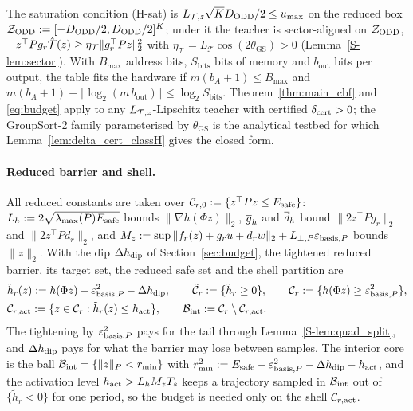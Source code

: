 The saturation condition (H-sat) is $L_{\mathcal{T},z}\sqrt{K}D_{\mathrm{ODD}}/2 \le u_{\max}$ on the reduced box $\mathcal{Z}_{\mathrm{ODD}} := [-D_{\mathrm{ODD}}/2, D_{\mathrm{ODD}}/2]^K$; under it the teacher is sector-aligned on $\mathcal{Z}_{\mathrm{ODD}}$, $-z^\top Pg_r\hat{\mathcal{T}}(z) \ge \eta_{\mathcal{T}}\|g_r^\top Pz\|_2^2$ with $\eta_{\mathcal{T}} = L_{\mathcal{T}}\cos(2\theta_{\mathrm{GS}}) > 0$ (Lemma~\ref{S-lem:sector}). With $B_{\max}$ address bits, $S_{\mathrm{bits}}$ bits of memory and $b_{\mathrm{out}}$ bits per output, the table fits the hardware if $m(b_A + 1) \le B_{\max}$ and $m(b_A+1) + \lceil\log_2(m\,b_{\mathrm{out}})\rceil \le \log_2 S_{\mathrm{bits}}$. Theorem~\ref{thm:main_cbf} and \eqref{eq:budget} apply to any $L_{\mathcal{T},z}$-Lipschitz teacher with certified $\delta_{\mathrm{cert}} > 0$; the GroupSort-2 family parameterised by $\theta_{\mathrm{GS}}$ is the analytical testbed for which Lemma~\ref{lem:delta_cert_classH} gives the closed form.

\paragraph{Reduced barrier and shell.}
All reduced constants are taken over $\mathcal{C}_{r,0} := \{z^\top Pz \le E_{\mathrm{safe}}\}$: $L_h := 2\sqrt{\lambda_{\max}(P)E_{\mathrm{safe}}}$ bounds $\|\nabla h(\Phi z)\|_2$, $\overline{g}_h$ and $\overline{d}_h$ bound $\|2z^\top Pg_r\|_2$ and $\|2z^\top Pd_r\|_2$, and $M_z := \sup\|f_r(z) + g_ru + d_rw\|_2 + L_{\perp,P}\varepsilon_{\mathrm{basis},P}$ bounds $\|\dot z\|_2$. With the dip $\Delta h_{\mathrm{dip}}$ of Section~\ref{sec:budget}, the tightened reduced barrier, its target set, the reduced safe set and the shell partition are
\begin{equation}
\label{eq:htilde}
\begin{aligned}
&\tilde h_r(z) := h(\Phi z) - \varepsilon_{\mathrm{basis},P}^2 - \Delta h_{\mathrm{dip}}, \qquad \tilde{\mathcal{C}}_r := \{\tilde h_r \ge 0\}, \qquad \mathcal{C}_r := \{h(\Phi z) \ge \varepsilon_{\mathrm{basis},P}^2\},\\
&\mathcal{C}_{r,\mathrm{act}} := \{z \in \mathcal{C}_r : \tilde h_r(z) \le h_{\mathrm{act}}\}, \qquad \mathcal{B}_{\mathrm{int}} := \mathcal{C}_r\setminus\mathcal{C}_{r,\mathrm{act}} .
\end{aligned}
\end{equation}
The tightening by $\varepsilon_{\mathrm{basis},P}^2$ pays for the tail through Lemma~\ref{S-lem:quad_split}, and $\Delta h_{\mathrm{dip}}$ pays for what the barrier may lose between samples. The interior core is the ball $\mathcal{B}_{\mathrm{int}} = \{\|z\|_P < r_{\min}\}$ with $r_{\min}^2 := E_{\mathrm{safe}} - \varepsilon_{\mathrm{basis},P}^2 - \Delta h_{\mathrm{dip}} - h_{\mathrm{act}}$, and the activation level $h_{\mathrm{act}} > L_hM_zT_s$ keeps a trajectory sampled in $\mathcal{B}_{\mathrm{int}}$ out of $\{\tilde h_r < 0\}$ for one period, so the budget is needed only on the shell $\mathcal{C}_{r,\mathrm{act}}$.

